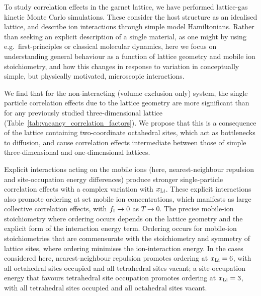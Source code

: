 \documentclass[aps,prb,twocolumn,superscriptaddress,reprint]{revtex4-1}
\newcommand{\xLi}{x_\m{Li}}
\begin{document}
To study correlation effects in the garnet lattice, we have performed  lattice-gas kinetic Monte Carlo simulations.\cite{Morgan_JOSS2017} These consider the host structure as an idealised lattice, and describe ion interactions through simple model Hamiltonians. Rather than seeking an explicit description of a single material, as one might by using e.g.\  first-principles or classical molecular dynamics,\cite{JalemEtAl_ChemMater2013,MeierEtAl_JPhysChemC2014,BurbanoEtAl_PhysRevLett2016} here we focus on understanding general behaviour as a function of lattice geometry and mobile ion stoichiometry, and how this changes in response to variation in conceptually simple, but physically motivated, microscopic interactions.

We find that for the non-interacting (volume exclusion only) system, the single particle correlation effects due to the lattice geometry are more significant than for any previously studied three-dimensional lattice (Table~\ref{tab:vacancy_correlation_factors}). We propose that this is a consequence of the lattice containing two-coordinate octahedral sites, which act as bottlenecks to diffusion, and cause correlation effects intermediate between those of simple three-dimensional and one-dimensional lattices. 

Explicit interactions acting on the mobile ions (here, nearest-neighbour repulsion and site-occupation energy differences) produce stronger single-particle correlation effects with a complex variation with $\xLi$. These explicit interactions also promote ordering at set mobile ion concentrations, which manifests as large collective correlation effects, with $f_{\mathrm{I}}\to0$ as $T\to0$.\cite{Murch_SolStatIonics1982} The precise mobile-ion stoichiometry where ordering occurs depends on the lattice geometry and the explicit form of the interaction energy term. Ordering occurs for mobile-ion stoichiometries that are commensurate with the stoichiometry and symmetry of lattice sites, where ordering minimises the ion-interaction energy. In the cases considered here, nearest-neighbour repulsion promotes ordering at $\xLi=6$, with all octahedral sites occupied and all tetrahedral sites vacant; a site-occupation energy that favours tetrahedral site occupation promotes ordering at $\xLi=3$, with all tetrahedral sites occupied and all octahedral sites vacant. 
\end{document}
